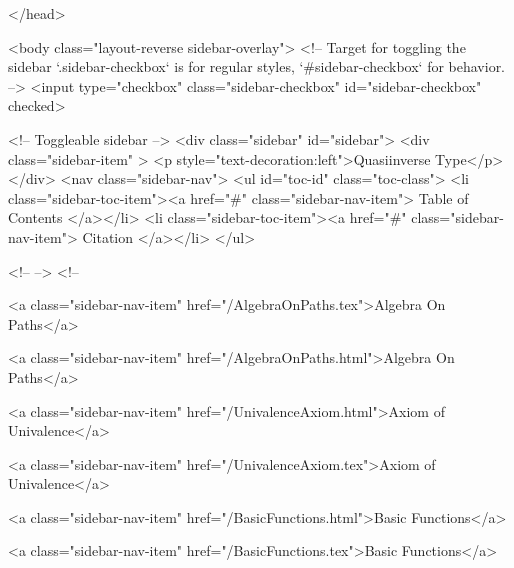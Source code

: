   
</head>




  <body class="layout-reverse sidebar-overlay">
    <!-- Target for toggling the sidebar `.sidebar-checkbox` is for regular
     styles, `#sidebar-checkbox` for behavior. -->
<input type="checkbox" class="sidebar-checkbox" id="sidebar-checkbox" checked>

<!-- Toggleable sidebar -->
<div class="sidebar" id="sidebar">
  <div class="sidebar-item" >
    <p style="text-decoration:left">Quasiinverse Type</p>
  </div>
  <nav class="sidebar-nav">
    <ul id="toc-id" class="toc-class">
  <li class="sidebar-toc-item"><a href="#" class="sidebar-nav-item"> Table of Contents </a></li>
  <li class="sidebar-toc-item"><a href="#" class="sidebar-nav-item"> Citation </a></li>
</ul>


    <!--  -->
    <!-- 
      
    
      
    
      
    
      
        
      
    
      
        
          <a class="sidebar-nav-item" href="/AlgebraOnPaths.tex">Algebra On Paths</a>
        
      
    
      
        
          <a class="sidebar-nav-item" href="/AlgebraOnPaths.html">Algebra On Paths</a>
        
      
    
      
        
          <a class="sidebar-nav-item" href="/UnivalenceAxiom.html">Axiom of Univalence</a>
        
      
    
      
        
          <a class="sidebar-nav-item" href="/UnivalenceAxiom.tex">Axiom of Univalence</a>
        
      
    
      
        
          <a class="sidebar-nav-item" href="/BasicFunctions.html">Basic Functions</a>
        
      
    
      
        
          <a class="sidebar-nav-item" href="/BasicFunctions.tex">Basic Functions</a>
        
      
    
